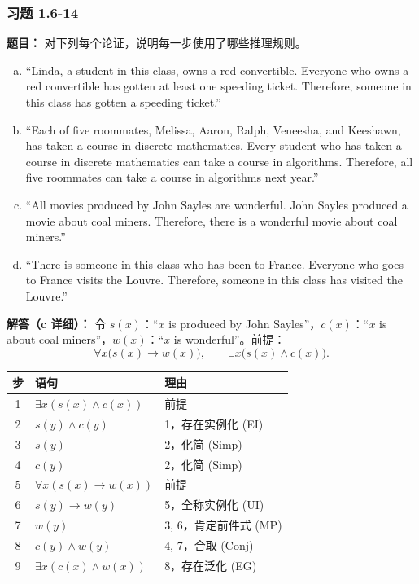 \documentclass[11pt,UTF8]{article}
\begin{document}
\subsubsection*{习题 1.6-14}
\textbf{题目：} 对下列每个论证，说明每一步使用了哪些推理规则。
\begin{enumerate}[a)]
    \item ``Linda, a student in this class, owns a red convertible. Everyone who owns a red convertible has gotten at least one speeding ticket. Therefore, someone in this class has gotten a speeding ticket.''
    \item ``Each of five roommates, Melissa, Aaron, Ralph, Veneesha, and Keeshawn, has taken a course in discrete mathematics. Every student who has taken a course in discrete mathematics can take a course in algorithms. Therefore, all five roommates can take a course in algorithms next year.''
    \item ``All movies produced by John Sayles are wonderful. John Sayles produced a movie about coal miners. Therefore, there is a wonderful movie about coal miners.''
    \item ``There is someone in this class who has been to France. Everyone who goes to France visits the Louvre. Therefore, someone in this class has visited the Louvre.''
\end{enumerate}

\textbf{解答（c 详细）：} 令 $s(x)$：``$x$ is produced by John Sayles''，$c(x)$：``$x$ is about coal miners''，$w(x)$：``$x$ is wonderful''。前提：
\[ \forall x\bigl(s(x)\to w(x)\bigr),\qquad \exists x\bigl(s(x)\land c(x)\bigr). \]

\begin{center}
\begin{tabular}{c|l|l}
\hline
步 & 语句 & 理由 \\
\hline
1 & $\exists x(s(x)\land c(x))$ & 前提 \\
2 & $s(y)\land c(y)$ & 1，存在实例化 (EI) \\
3 & $s(y)$ & 2，化简 (Simp) \\
4 & $c(y)$ & 2，化简 (Simp) \\
5 & $\forall x(s(x)\to w(x))$ & 前提 \\
6 & $s(y)\to w(y)$ & 5，全称实例化 (UI) \\
7 & $w(y)$ & 3, 6，肯定前件式 (MP) \\
8 & $c(y)\land w(y)$ & 4, 7，合取 (Conj) \\
9 & $\exists x(c(x)\land w(x))$ & 8，存在泛化 (EG) \\
\hline
\end{tabular}
\end{center}
\end{document}
